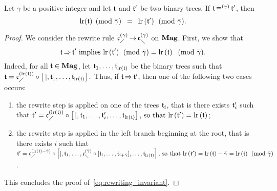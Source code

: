 \begin{Lemma}\label{lem:left_rank_and_CongrCAs}
    Let $\gamma$ be a positive integer and let $\mathfrak{t}$ and
    $\mathfrak{t}'$ be two binary trees. If $\mathfrak{t} \operatorname{\equiv}^{(\gamma)} \mathfrak{t}'$, then
    \begin{equation}
        \mathrm{lr}(\mathfrak{t}) \pmod{\bar{\gamma}}
        \enspace = \enspace
        \mathrm{lr}\left(\mathfrak{t}'\right) \pmod{\bar{\gamma}}.
    \end{equation}
\end{Lemma}
\begin{proof}
  We consider the rewrite rule $\mathfrak{c}^{\left(\gamma\right)}_{\diagup} \operatorname{\to} \mathfrak{c}^{\left(\gamma\right)}_{\diagdown}$
    on $\mathbf{Mag}$. First, we show that
    \begin{equation} \label{eq:rewriting_invariant}
        \mathfrak{t} \operatorname{\Rightarrow} \mathfrak{t}'
        \mbox{ implies }
        \mathrm{lr}\left(\mathfrak{t}'\right) \pmod{\bar{\gamma}} = \mathrm{lr}\left(\mathfrak{t}\right)
        \, \pmod{\bar{\gamma}}.
    \end{equation}
    Indeed, for all $\mathfrak{t} \in \mathbf{Mag}$, let
    $\mathfrak{t}_1, \dots, \mathfrak{t}_{\mathrm{lr}\left(\mathfrak{t}\right)}$ be the binary trees
    such that
    \begin{math}
      \mathfrak{t} =
       \mathfrak{c}^{\left(\mathrm{lr}\left(\mathfrak{t}\right)\right)}_{\diagup} \circ
      \left[\, |,\mathfrak{t}_1, \dots, \mathfrak{t}_{\mathrm{lr}\left(\mathfrak{t}\right)} \right].
    \end{math}
    Thus, if $\mathfrak{t} \operatorname{\Rightarrow} \mathfrak{t}'$, then one of the following two
    cases occurs:
    \begin{enumerate}[label={(\it\roman*)}]
    \item the rewrite step is applied on one of the trees $\mathfrak{t}_i$,
      that is there exists $\mathfrak{t}_i'$ such that
            \begin{math}
              \mathfrak{t}' = \mathfrak{c}^{\left(\mathrm{lr}\left(\mathfrak{t}\right)\right)}_{\diagup} \circ
              \left[\, | ,\mathfrak{t}_1, \dots, \mathfrak{t}_i',\dots,
                    \mathfrak{t}_{\mathrm{lr}\left(\mathfrak{t}\right)}
              \right] \mbox{, so that }
              \mathrm{lr}\left(\mathfrak{t}'\right) = \mathrm{lr}\left(\mathfrak{t}\right);
            \end{math}
          \item the rewrite step is applied in the left branch beginning
            at the root, that is there exists $i$ such that
            \begin{math}
              \mathfrak{t}' = \mathfrak{c}^{\left(\mathrm{lr}\left(\mathfrak{t}\right)-\bar{\gamma}\right)}_{\diagup} \circ
              \left[ | ,\mathfrak{t}_1, \dots,
                 \mathfrak{c}^{\left(\bar{\gamma}\right)}_{\diagdown} \circ
                 [\mathfrak{t}_{i},\dots, \mathfrak{t}_{i+\bar{\gamma}}]
                 ,\dots, \mathfrak{t}_{\mathrm{lr}\left(\mathfrak{t}\right)}
              \right]
              \mbox{, so that }\\
              \mathrm{lr}\left(\mathfrak{t}'\right) =
              \mathrm{lr}\left(\mathfrak{t}\right) - \bar{\gamma} =
              \mathrm{lr}\left(\mathfrak{t}\right) \pmod{\bar{\gamma}}
            \end{math}.
    \end{enumerate}
    This concludes the proof of~\eqref{eq:rewriting_invariant}.
    \smallbreak


\end{proof}
